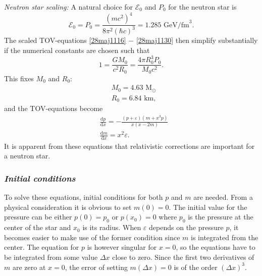 \documentclass[twocolumn]{article}
\begin{document}
\begin{large}
\textit{Neutron star scaling:}
A natural choice for $\mathcal{E}_0$ and $P_0$ for the neutron star is
\begin{equation}
    \mathcal{E}_0 = P_0 = \frac{(mc^2)^4}{8\pi^2(\hbar c)^3} = 1.285 \text{ GeV/fm}^3.
\end{equation}
The scaled TOV-equations \eqref{28maj1116} $-$ \eqref{28maj1130} then simplify substantially if the numerical constants are chosen such that
\begin{equation}
    \label{26maj1005}
    1 = \frac{GM_0}{c^2R_0} = \frac{4\pi R_0^3P_0}{M_0c^2}.
\end{equation}
This fixes $M_0$ and $R_0$:
\begin{equation}
    \begin{split}
    &M_0 = 4.63 \text{ M}_\odot \\ 
    &R_0 = 6.84 \text{ km},
    \end{split}
\end{equation}
and the TOV-equations become
\begin{equation}
    \label{24maj1640}
    \begin{split}
        &\frac{\text{d}p}{\text{d}x} = -\frac{(p+\varepsilon)(m+x^3p)}{x(x-2m)} \\  %
        &\frac{\text{d}m}{\text{d}x} = x^2\varepsilon. %
    \end{split}
\end{equation}
It is apparent from these equations that relativistic corrections are important for a neutron star. 

\subsubsection*{\textit{Initial conditions}}
To solve these equations, initial conditions for both $p$ and $m$ are needed. From a physical consideration it is obvious to set $m(0)=0$. The initial value for the pressure can be either $p(0) = p_0$ or $p(x_0) = 0$ where $p_0$ is the pressure at the center of the star and $x_0$ is its radius. When $\varepsilon$ depends on the pressure $p$, it becomes easier to make use of the former condition since $m$ is integrated from the center. The equation for $p$ is however singular for $x=0$, so the equations have to be integrated from some value $\Delta x$ close to zero. Since the first two derivatives of $m$ are zero at $x=0$, the error of setting $m(\Delta x) = 0$ is of the order $(\Delta x)^3$.


\end{large}
\end{document}
